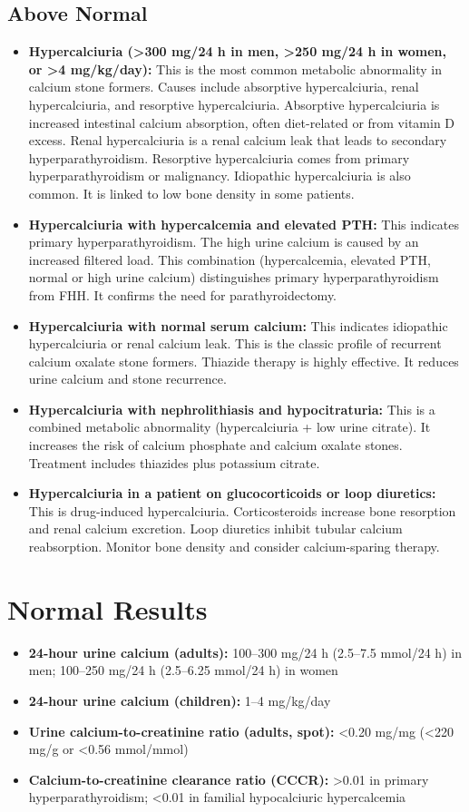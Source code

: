 \subsection*{Above Normal}
\begin{itemize}
  \item \textbf{Hypercalciuria (>300 mg/24 h in men, >250 mg/24 h in women, or >4 mg/kg/day):} This is the most common metabolic abnormality in calcium stone formers. Causes include absorptive hypercalciuria, renal hypercalciuria, and resorptive hypercalciuria. Absorptive hypercalciuria is increased intestinal calcium absorption, often diet-related or from vitamin D excess. Renal hypercalciuria is a renal calcium leak that leads to secondary hyperparathyroidism. Resorptive hypercalciuria comes from primary hyperparathyroidism or malignancy. Idiopathic hypercalciuria is also common. It is linked to low bone density in some patients.
  \item \textbf{Hypercalciuria with hypercalcemia and elevated PTH:} This indicates primary hyperparathyroidism. The high urine calcium is caused by an increased filtered load. This combination (hypercalcemia, elevated PTH, normal or high urine calcium) distinguishes primary hyperparathyroidism from FHH. It confirms the need for parathyroidectomy.
  \item \textbf{Hypercalciuria with normal serum calcium:} This indicates idiopathic hypercalciuria or renal calcium leak. This is the classic profile of recurrent calcium oxalate stone formers. Thiazide therapy is highly effective. It reduces urine calcium and stone recurrence.
  \item \textbf{Hypercalciuria with nephrolithiasis and hypocitraturia:} This is a combined metabolic abnormality (hypercalciuria + low urine citrate). It increases the risk of calcium phosphate and calcium oxalate stones. Treatment includes thiazides plus potassium citrate.
  \item \textbf{Hypercalciuria in a patient on glucocorticoids or loop diuretics:} This is drug-induced hypercalciuria. Corticosteroids increase bone resorption and renal calcium excretion. Loop diuretics inhibit tubular calcium reabsorption. Monitor bone density and consider calcium-sparing therapy.
\end{itemize}

\section*{Normal Results}
\begin{itemize}
  \item \textbf{24-hour urine calcium (adults):} 100--300 mg/24 h (2.5--7.5 mmol/24 h) in men; 100--250 mg/24 h (2.5--6.25 mmol/24 h) in women
  \item \textbf{24-hour urine calcium (children):} 1--4 mg/kg/day
  \item \textbf{Urine calcium-to-creatinine ratio (adults, spot):} <0.20 mg/mg (<220 mg/g or <0.56 mmol/mmol)
  \item \textbf{Calcium-to-creatinine clearance ratio (CCCR):} >0.01 in primary hyperparathyroidism; <0.01 in familial hypocalciuric hypercalcemia
\end{itemize}

